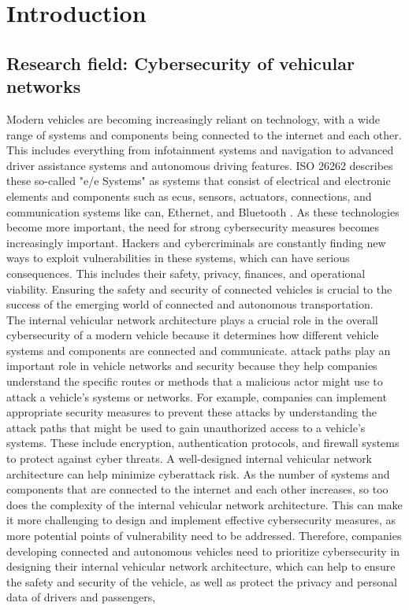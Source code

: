 \chapter{Introduction}
\label{chp:introduction}

\section{Research field: Cybersecurity of vehicular networks}\label{sec:field}

Modern vehicles are becoming increasingly reliant on technology, with a wide range of systems and components being connected to the internet and each other. 
This includes everything from infotainment systems and navigation to advanced driver assistance systems and autonomous driving features.
ISO 26262 describes these so-called "\gls{e/e} Systems" as systems that consist of electrical and electronic elements and components such as \gls{ecu}s, sensors, actuators, connections, and communication systems like \gls{can}, Ethernet, and Bluetooth \cite{iso26262}.
As these technologies become more important, the need for strong cybersecurity measures becomes increasingly important. 
Hackers and cybercriminals are constantly finding new ways to exploit vulnerabilities in these systems, which can have serious consequences. 
This includes their safety, privacy, finances, and operational viability. Ensuring the safety and security of connected vehicles is crucial to the success of the emerging world of connected and autonomous transportation.
\\

The internal vehicular network architecture plays a crucial role in the overall cybersecurity of a modern vehicle because it determines how different vehicle systems and components are connected and communicate. 
\gls{attack path}s play an important role in vehicle networks and security because they help companies understand the specific routes or methods that a malicious actor might use to attack a vehicle's systems or networks. 
For example, companies can implement appropriate security measures to prevent these attacks by understanding the attack paths that might be used to gain unauthorized access to a vehicle's systems. 
These include encryption, authentication protocols, and firewall systems to protect against cyber threats. 
A well-designed internal vehicular network architecture can help minimize cyberattack risk. 
As the number of systems and components that are connected to the internet and each other increases, so too does the complexity of the internal vehicular network architecture. 
This can make it more challenging to design and implement effective cybersecurity measures, as more potential points of vulnerability need to be addressed. 
Therefore, companies developing connected and autonomous vehicles need to prioritize cybersecurity in designing their internal vehicular network architecture, 
which can help to ensure the safety and security of the vehicle, as well as protect the privacy and personal data of drivers and passengers,
\\

